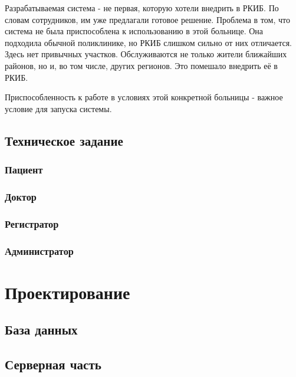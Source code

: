 \documentclass[a4paper,article]{article}
\begin{document}
        Разрабатываемая система - не первая, которую хотели внедрить в РКИБ. По словам сотрудников, им уже предлагали готовое решение. Проблема в том, что система не была приспособлена к использованию в этой больнице. Она подходила обычной поликлинике, но РКИБ слишком сильно от них отличается. Здесь нет привычных участков. Обслуживаются не только жители ближайших районов, но и, во том числе, других регионов. Это помешало внедрить её в РКИБ.

        Приспособленность к работе в условиях этой конкретной больницы - важное условие для запуска системы.

    \subsection{Техническое задание}

    \subsubsection{Пациент}

    \subsubsection{Доктор}

    \subsubsection{Регистратор}

    \subsubsection{Администратор}

    \pagestyle{plain}

    \newpage

    \section{Проектирование}

    \subsection{База данных}

    \subsection{Серверная часть}
\end{document}
